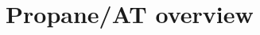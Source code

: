 \documentclass[numbers, 10pt]{sigplanconf}
\newcommand{\sysname}{{\text{}\small \sf Propane/AT}\xspace}
\newcommand{\sysnamesec}{{\sf Propane/AT}\xspace}
\begin{document}
%

%
%
%
%

\section{Propane/AT overview}
\label{sec:overview}

%
%
\end{document}
